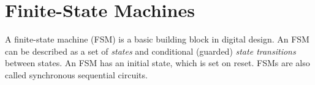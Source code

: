 \documentclass[%
    10pt,
    headinclude, footexclude,
    openright, %
    notitlepage,
    cleardoubleempty,
    headsepline,
    pointlessnumbers,
    bibtotoc, idxtotoc,
    ]{scrbook}
\newcommand{\myref}[2]{\href{#1}{#2}}
\renewcommand{\myref}[2]{{#2}{\footnote{\url{#1}}}}
\begin{document}
%
%
%
%
%
%
%


\chapter{Finite-State Machines}

A finite-state machine (FSM) is a basic building block in digital design.
An FSM can be described as a set of \emph{states} and conditional (guarded)
\emph{state transitions} between states.
An FSM has an initial state, which is set on reset.
FSMs are also called synchronous sequential circuits.
\end{document}
